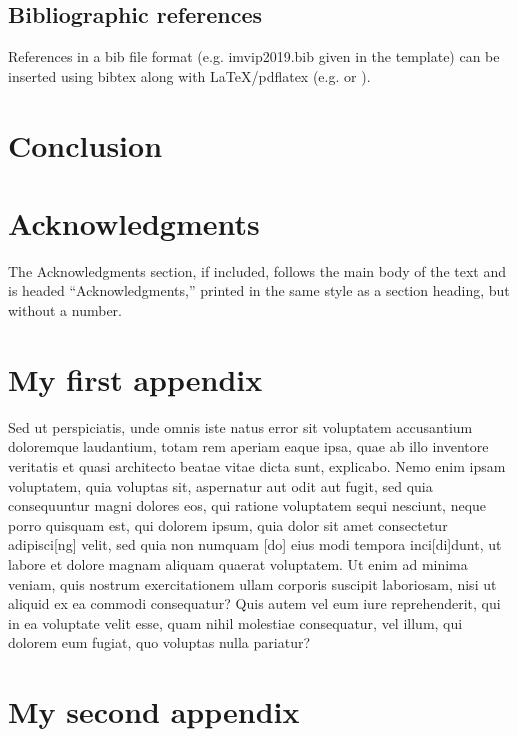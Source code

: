 \documentclass[a4paper,11pt]{article}
\begin{document}
\subsection{Bibliographic references}
References in a bib file format (e.g. imvip2019.bib given in the template) can be inserted using bibtex along with
\LaTeX\xspace/pdflatex (e.g.  \cite{hartley} or  \cite{jain, goodfellow}). 

\section{Conclusion}


\section*{Acknowledgments}

The Acknowledgments section, if included,
		       follows the main body of the text and is headed
		       ``Acknowledgments,'' printed in the same style
		       as a section heading, but without a number.

\appendix

\section{My first appendix }

Sed ut perspiciatis, unde omnis iste natus error sit voluptatem accusantium doloremque laudantium, totam rem aperiam eaque ipsa, quae ab illo inventore veritatis et quasi architecto beatae vitae dicta sunt, explicabo. Nemo enim ipsam voluptatem, quia voluptas sit, aspernatur aut odit aut fugit, sed quia consequuntur magni dolores eos, qui ratione voluptatem sequi nesciunt, neque porro quisquam est, qui dolorem ipsum, quia dolor sit amet consectetur adipisci[ng] velit, sed quia non numquam [do] eius modi tempora inci[di]dunt, ut labore et dolore magnam aliquam quaerat voluptatem. Ut enim ad minima veniam, quis nostrum exercitationem ullam corporis suscipit laboriosam, nisi ut aliquid ex ea commodi consequatur? Quis autem vel eum iure reprehenderit, qui in ea voluptate velit esse, quam nihil molestiae consequatur, vel illum, qui dolorem eum fugiat, quo voluptas nulla pariatur?


\section{My second appendix }
\end{document}
